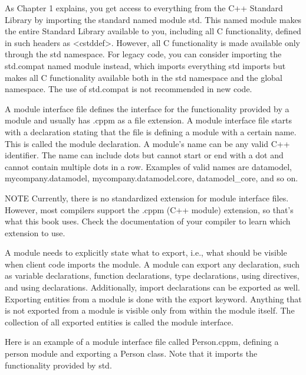 

As Chapter 1 explains, you get access to everything from the C++ Standard Library by importing the standard named module std. This named module makes the entire Standard Library available to you, including all C functionality, defined in such headers as <cstddef>. However, all C functionality is made available only through the std namespace. For legacy code, you can consider importing the std.compat named module instead, which imports everything std imports but makes all C functionality available both in the std namespace and the global namespace. The use of std.compat is not recommended in new code.


A module interface file defines the interface for the functionality provided by a module and usually has .cppm as a file extension. A module interface file starts with a declaration stating that the file is defining a module with a certain name. This is called the module declaration. A module’s name can be any valid C++ identifier. The name can include dots but cannot start or end with a dot and cannot contain multiple dots in a row. Examples of valid names are datamodel, mycompany.datamodel, mycompany.datamodel.core, datamodel\_core, and so on.

\begin{myNotic}{NOTE}
Currently, there is no standardized extension for module interface files. However, most compilers support the .cppm (C++ module) extension, so that’s what this book uses. Check the documentation of your compiler to learn which extension to use.
\end{myNotic}

A module needs to explicitly state what to export, i.e., what should be visible when client code imports the module. A module can export any declaration, such as variable declarations, function declarations, type declarations, using directives, and using declarations. Additionally, import declarations can be exported as well. Exporting entities from a module is done with the export keyword. Anything that is not exported from a module is visible only from within the module itself. The collection of all exported entities is called the module interface.

Here is an example of a module interface file called Person.cppm, defining a person module and exporting a Person class. Note that it imports the functionality provided by std.

